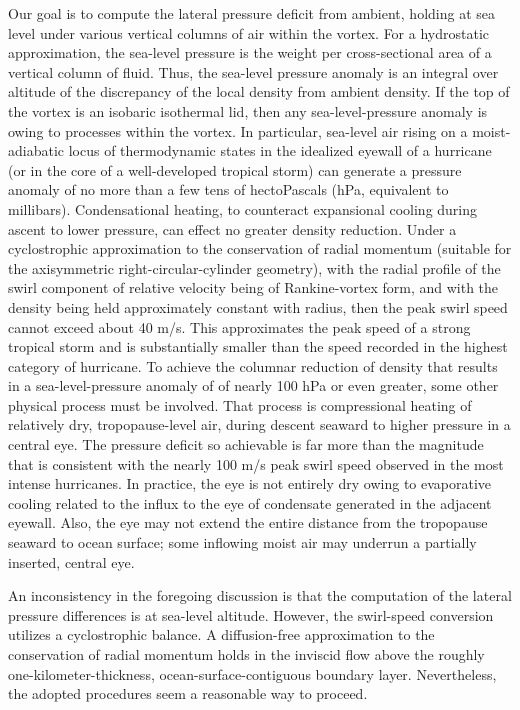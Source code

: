 \documentclass[preprint, prX]{revtex4}
\begin{document}
Our goal is to compute the lateral pressure deficit from ambient, holding at sea level under various vertical columns of air within the vortex. For a hydrostatic approximation, the sea-level pressure is the weight per cross-sectional area of a vertical column of fluid. Thus, the sea-level pressure anomaly is an integral over altitude of the discrepancy of the local density from ambient density. If the top of the vortex is an isobaric isothermal lid, then any sea-level-pressure anomaly is owing to processes within the vortex.
In particular, sea-level air rising on a moist-adiabatic locus of thermodynamic states in the idealized eyewall of a hurricane (or in the core of a well-developed tropical storm) can generate a pressure anomaly of no more than a few tens of hectoPascals (hPa, equivalent to millibars). Condensational heating, to counteract expansional cooling during ascent to lower pressure, can effect no greater density reduction. Under a cyclostrophic approximation to the conservation of radial momentum (suitable for the axisymmetric right-circular-cylinder geometry), with the radial profile of the swirl component of relative velocity being of Rankine-vortex form, and with the density being held approximately constant with radius, then the peak swirl speed cannot exceed about 40 m/s. This approximates the peak speed of a strong tropical storm and is substantially smaller than the speed recorded in the highest category of hurricane. 
To achieve the columnar reduction of density that results in a sea-level-pressure anomaly of of nearly 100 hPa or even greater, some other physical process must be involved. That process is compressional heating of relatively dry, tropopause-level air, during descent seaward to higher pressure in a central eye.  The pressure deficit so achievable is far more than the magnitude that is consistent with the nearly 100 m/s peak swirl speed observed in the most intense hurricanes. In practice, the eye is not entirely dry owing to evaporative cooling related to the influx to the eye of condensate generated in the adjacent eyewall. Also, the eye may not extend the entire distance from the tropopause seaward to ocean surface; some inflowing moist air may underrun a partially inserted, central eye.

An inconsistency in the foregoing discussion is that the computation of the lateral pressure differences is at sea-level altitude. However, the swirl-speed conversion utilizes a cyclostrophic balance. A diffusion-free approximation to the conservation of radial momentum holds in the inviscid flow above the roughly one-kilometer-thickness, ocean-surface-contiguous boundary layer. Nevertheless, the adopted procedures seem a reasonable way to proceed. 
\end{document}
